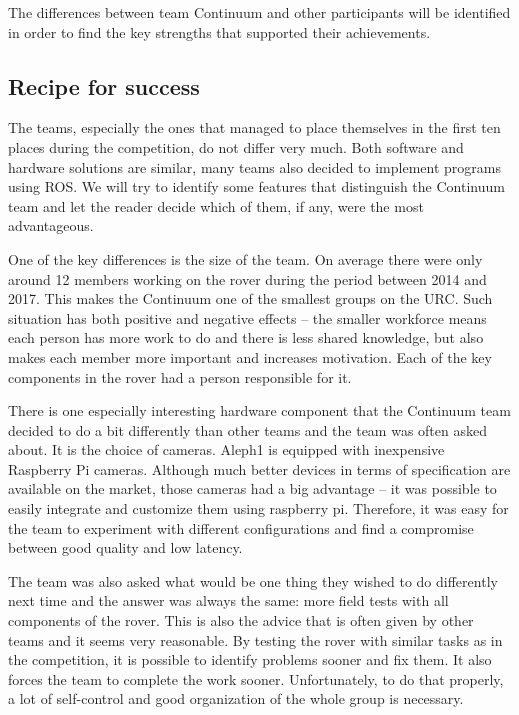 \documentclass[runningheads,a4paper]{llncs}
\begin{document}
The differences between team Continuum and other participants will be identified in order to find the key strengths that supported their achievements.

\subsection{Recipe for success}
The teams, especially the ones that managed to place themselves in the first ten places during the competition, do not differ very much. Both software and hardware solutions are similar, many teams also decided to implement programs using ROS. We will try to identify some features that distinguish the Continuum team and let the reader decide which of them, if any, were the most advantageous.

One of the key differences is the size of the team. On average there were only around 12 members working on the rover during the period between 2014 and 2017. This makes the Continuum one of the smallest groups on the URC. Such situation has both positive and negative effects – the smaller workforce means each person has more work to do and there is less shared knowledge, but also makes each member more important and increases motivation. Each of the key components in the rover had a person responsible for it. 

There is one especially interesting hardware component that the Continuum team decided to do a bit differently than other teams and the team was often asked about. It is the choice of cameras. Aleph1 is equipped with inexpensive Raspberry Pi cameras\cite{rasppi}. Although much better devices in terms of specification are available on the market, those cameras had a big advantage – it was possible to easily integrate and customize them using raspberry pi. Therefore, it was easy for the team to experiment with different configurations and find a compromise between good quality and low latency. 

The team was also asked what would be one thing they wished to do differently next time and the answer was always the same: more field tests with all components of the rover. This is also the advice that is often given by other teams and it seems very reasonable. By testing the rover with similar tasks as in the competition, it is possible to identify problems sooner and fix them. It also forces the team to complete the work sooner. Unfortunately, to do that properly, a lot of self-control and good organization of the whole group is necessary. 
\end{document}
